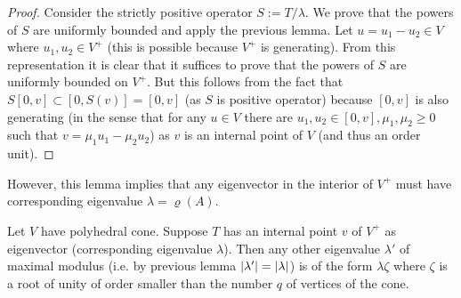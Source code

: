 \documentclass{article}
\begin{document}
\begin{proof}
Consider the strictly positive operator $S:=T/\lambda$. We prove that the powers of $S$ are uniformly bounded and apply the previous lemma.
Let $u=u_1-u_2\in V$ where $u_1,u_2\in V^+$ (this is possible because $V^+$ is generating). From this representation it is clear that it suffices to prove that the powers of $S$ are uniformly bounded on $V^+$. But this follows from the fact that $S[0,v]\subset [0,S(v)]=[0,v]$ (as $S$ is positive operator) because $[0,v]$ is also generating (in the sense that for any $u\in V$ there are $u_1,u_2\in[0,v],\mu_1,\mu_2\geq 0$ such that $v=\mu_1u_1-\mu_2u_2$) as $v$ is an internal point of $V$ (and thus an order unit). 
\end{proof}

\begin{remark}
However, this lemma implies that any eigenvector in the interior of $V^+$ must have corresponding eigenvalue $\lambda=\varrho(A)$.
\end{remark}

\begin{lemma}\label{lem6}
Let $V$ have polyhedral cone. Suppose $T$ has an internal point $v$ of $V^+$ as eigenvector (corresponding eigenvalue $\lambda$). Then any other eigenvalue $\lambda'$ of maximal modulus (i.e. by previous lemma $\left| \lambda'\right|=\left| \lambda\right|$) is of the form $\lambda\zeta$ where $\zeta$ is a root of unity of order smaller than the number $q$ of vertices of the cone.  
\end{lemma}
\end{document}
